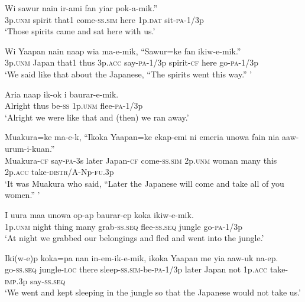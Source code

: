 \ea
\gll  Wi  sawur  nain  ir-ami  fan  yiar  pok-a-mik.” \\
3p.\textsc{unm}  spirit{{\footnotemark}} that1  come-\textsc{ss}.\textsc{sim}  here  1p.\textsc{dat}  sit-\textsc{pa}-1/3p \\
\glt ‘Those spirits came and sat here with us.’ \\
 \z

\ea
\gll  Wi  Yaapan  nain  naap  wia  ma-e-mik,  “Sawur=ke       fan  ikiw-e-mik.” \\
3p.\textsc{unm}  Japan  that1  thus  3p.\textsc{acc}  say-\textsc{pa}-1/3p  spirit-\textsc{cf} here  go-\textsc{pa}-1/3p \\
\glt ‘We said like that about the Japanese, “The spirits went this way.” ’ \\
\z


\ea
\gll  Aria  naap  ik-ok  i  baurar-e-mik. \\
Alright  thus  be-\textsc{ss}  1p.\textsc{unm}  flee-\textsc{pa}-1/3p \\
\glt ‘Alright we were like that and (then) we ran away.’ \\
\z


\ea
\gll  Muakura=ke  ma-e-k,  ``Ikoka  Yaapan=ke  ekap-emi  ni       emeria  unowa  fain  nia  aaw-urum-i-kuan.” \\
Muakura-\textsc{cf}  say-\textsc{pa}-3s  later  Japan-\textsc{cf}  come-\textsc{ss}.\textsc{sim}  2p.\textsc{unm} woman  many  this  2p.\textsc{acc}  take-\textsc{distr}/A-Np-\textsc{fu}.3p \\
\glt ‘It was Muakura who said, “Later the Japanese will come and take all of you women.” ’ \\
\z


\ea
\gll  I  uura  maa  unowa  op-ap  baurar-ep  koka       ikiw-e-mik. \\
1p.\textsc{unm}  night  thing  many  grab-\textsc{ss.seq}  flee-\textsc{ss.seq}  jungle go-\textsc{pa}-1/3p \\
\glt ‘At night we grabbed our belongings and fled and went into the jungle.’ \\
\z


\ea
\gll  Iki(w-e)p  koka=pa  nan  in-em-ik-e-mik,       ikoka  Yaapan  me  yia  aaw-uk  na-ep. \\
go-\textsc{ss.seq}  jungle-\textsc{loc}  there  sleep-\textsc{ss}.\textsc{sim}-be-\textsc{pa}-1/3p later  Japan  not  1p.\textsc{acc}  take-\textsc{imp}.3p  say-\textsc{ss.seq} \\
\glt ‘We went and kept sleeping in the jungle so that the Japanese would not take us.’ \\
\z


